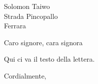 \documentclass{letter}
\begin{document}
\begin{letter}{Solomon Taiwo\\Strada Pincopallo\\Ferrara}

\opening{Caro signore, cara signora}

Qui ci va il testo della lettera.

\closing{Cordialmente,}

\end{letter}
\end{document}
